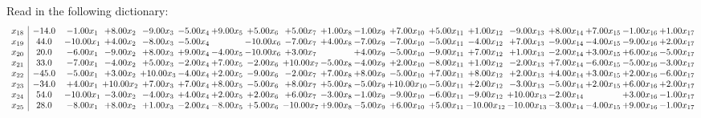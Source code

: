\documentclass[9pt]{article}
\begin{document}
Read in the following dictionary:
\[\begin{array}{c| c c@{\hskip 2pt} c@{\hskip 2pt} c@{\hskip 2pt} c@{\hskip 2pt} c@{\hskip 2pt} c@{\hskip 2pt} c@{\hskip 2pt} c@{\hskip 2pt} c@{\hskip 2pt} c@{\hskip 2pt} c@{\hskip 2pt} c@{\hskip 2pt} c@{\hskip 2pt} c@{\hskip 2pt} c@{\hskip 2pt} c@{\hskip 2pt} c@{\hskip 2pt} }
 x_{18}   &  -14.0 & -1.00 x_{1} & +  8.00 x_{2} & -9.00 x_{3} & -5.00 x_{4} & +  9.00 x_{5} & +  5.00 x_{6} & +  5.00 x_{7} & +  1.00 x_{8} & -1.00 x_{9} & +  7.00 x_{10} & +  5.00 x_{11} & +  1.00 x_{12} & -9.00 x_{13} & +  8.00 x_{14} & +  7.00 x_{15} & -1.00 x_{16} & +  1.00 x_{17}\\
 x_{19}   &  44.0 & -10.00 x_{1} & +  4.00 x_{2} & -8.00 x_{3} & -5.00 x_{4} &   & -10.00 x_{6} & -7.00 x_{7} & +  4.00 x_{8} & -7.00 x_{9} & -7.00 x_{10} & -5.00 x_{11} & -4.00 x_{12} & +  7.00 x_{13} & -9.00 x_{14} & -4.00 x_{15} & -9.00 x_{16} & +  2.00 x_{17}\\
 x_{20}   &  20.0 & -6.00 x_{1} & -9.00 x_{2} & +  8.00 x_{3} & +  9.00 x_{4} & -4.00 x_{5} & -10.00 x_{6} & +  3.00 x_{7} &   & +  4.00 x_{9} & -5.00 x_{10} & -9.00 x_{11} & +  7.00 x_{12} & +  1.00 x_{13} & -2.00 x_{14} & +  3.00 x_{15} & +  6.00 x_{16} & -5.00 x_{17}\\
 x_{21}   &  33.0 & -7.00 x_{1} & -4.00 x_{2} & +  5.00 x_{3} & -2.00 x_{4} & +  7.00 x_{5} & -2.00 x_{6} & + 10.00 x_{7} & -5.00 x_{8} & -4.00 x_{9} & +  2.00 x_{10} & -8.00 x_{11} & +  1.00 x_{12} & -2.00 x_{13} & +  7.00 x_{14} & -6.00 x_{15} & -5.00 x_{16} & -3.00 x_{17}\\
 x_{22}   &  -45.0 & -5.00 x_{1} & +  3.00 x_{2} & + 10.00 x_{3} & -4.00 x_{4} & +  2.00 x_{5} & -9.00 x_{6} & -2.00 x_{7} & +  7.00 x_{8} & +  8.00 x_{9} & -5.00 x_{10} & +  7.00 x_{11} & +  8.00 x_{12} & +  2.00 x_{13} & +  4.00 x_{14} & +  3.00 x_{15} & +  2.00 x_{16} & -6.00 x_{17}\\
 x_{23}   &  -34.0 & +  4.00 x_{1} & + 10.00 x_{2} & +  7.00 x_{3} & +  7.00 x_{4} & +  8.00 x_{5} & -5.00 x_{6} & +  8.00 x_{7} & +  5.00 x_{8} & -5.00 x_{9} & + 10.00 x_{10} & -5.00 x_{11} & +  2.00 x_{12} & -3.00 x_{13} & -5.00 x_{14} & +  2.00 x_{15} & +  6.00 x_{16} & +  2.00 x_{17}\\
 x_{24}   &  54.0 & -10.00 x_{1} & -3.00 x_{2} & -4.00 x_{3} & +  4.00 x_{4} & +  2.00 x_{5} & +  2.00 x_{6} & +  6.00 x_{7} & -3.00 x_{8} & -1.00 x_{9} & -9.00 x_{10} & -6.00 x_{11} & -9.00 x_{12} & + 10.00 x_{13} & -2.00 x_{14} &   & +  3.00 x_{16} & -1.00 x_{17}\\
 x_{25}   &  28.0 & -8.00 x_{1} & +  8.00 x_{2} & +  1.00 x_{3} & -2.00 x_{4} & -8.00 x_{5} & +  5.00 x_{6} & -10.00 x_{7} & +  9.00 x_{8} & -5.00 x_{9} & +  6.00 x_{10} & +  5.00 x_{11} & -10.00 x_{12} & -10.00 x_{13} & -3.00 x_{14} & -4.00 x_{15} & +  9.00 x_{16} & -1.00 x_{17}\\

\end{array}\]
\end{document}
